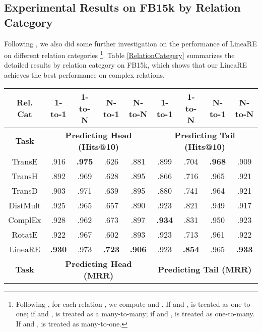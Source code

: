\documentclass[conference]{IEEEtran}
\begin{document}
\subsection{Experimental Results on FB15k by Relation Category}
Following \cite{TransE,TransH,TransD,DistMult,RotatE}, we also did some further investigation on the performance of LineaRE on different relation categories
\footnote{
	Following \cite{TransH}, for each relation , we compute  and . If  and ,  is treated as one-to-one; if  and ,  is treated as a many-to-many; if  and ,  is treated as one-to-many. If  and ,  is treated as many-to-one.
}.
Table \ref{RelationCategery} summarizes the detailed results by relation category
on FB15k, which shows that our LineaRE achieves the best performance on complex relations.
\begin{table*}[t]
	\caption{
		The detailed link prediction results by relation category on FB15k.
	}
	\label{RelationCategery}
	\centering
	\begin{tabular}{|c||c|c|c|c||c|c|c|c|}
		\hline
		\textbf{Rel. Cat}
		& \textbf{1-to-1}	& \textbf{1-to-N}	& \textbf{N-to-1}	& \textbf{N-to-N}	& \textbf{1-to-1}	& \textbf{1-to-N}	& \textbf{N-to-1}	& \textbf{N-to-N}  \\
		\hline
		\textbf{Task}
		& \multicolumn{4}{c||}{\textbf{Predicting Head (Hits@10)}}
		& \multicolumn{4}{c||}{\textbf{Predicting Tail (Hits@10)}}   \\
		\hline
		TransE \cite{TransE}	& .916	& \textbf{.975}	& .626	& .881	& .899	& .704	& \textbf{.968}	& .909  \\
		TransH \cite{TransH}	& .892	& .969	& .628	& .895	& .866	& .716	& .965	& .921  \\
		TransD \cite{TransH}	& .903	& .971	& .639	& .895	& .880	& .741	& .964	& .921  \\
		DistMult \cite{DistMult}& .925	& .965	& .657	& .890	& .923	& .821	& .949	& .917  \\
		ComplEx	\cite{ComplEx} & .928	& .962	& .673	& .897	& \textbf{.934}	& .831	& .950	& .923  \\
		RotatE \cite{RotatE}	& .922	& .967	& .602	& .893	& .923	& .713	& .961	& .922  \\
		\hline
		LineaRE			& \textbf{.930}	& .973	& \textbf{.723}	& \textbf{.906}	& .923	& \textbf{.854}	& .965	& \textbf{.933}  \\
		\hline
		\hline
		\textbf{Task}
		& \multicolumn{4}{c||}{\textbf{Predicting Head (MRR)}}
		& \multicolumn{4}{c||}{\textbf{Predicting Tail (MRR)}}   \\
		\hline

\end{tabular}
\end{table*}
\end{document}

